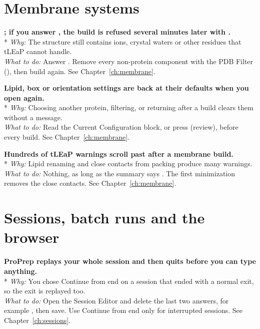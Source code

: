 \section{Membrane systems}\label{sec:troubleshooting-membrane}

{\bfseries {}; if you answer , the build is
refused several minutes later with .}\\*
\emph{Why:} The structure still contains ions, crystal waters or other
residues that tLEaP cannot handle.\\
\emph{What to do:} Answer . Remove every non-protein component with the
PDB Filter (), then build again. See Chapter~\ref{ch:membrane}.

{\bfseries Lipid, box or orientation settings are back at their defaults when
you open  again.}\\*
\emph{Why:} Choosing another protein, filtering, or returning after a build
clears them without a message.\\
\emph{What to do:} Read the \textsf{Current Configuration} block, or press
 (review), before every build. See Chapter~\ref{ch:membrane}.

{\bfseries Hundreds of tLEaP warnings scroll past after a membrane build.}\\*
\emph{Why:} Lipid renaming and close contacts from packing produce many
warnings.\\
\emph{What to do:} Nothing, as long as the summary says .
The first minimization removes the close contacts. See
Chapter~\ref{ch:membrane}.

\section{Sessions, batch runs and the browser}\label{sec:troubleshooting-sessions}

{\bfseries ProPrep replays your whole session and then quits before you can
type anything.}\\*
\emph{Why:} You chose \textsf{Continue from end} on a session that ended with
a normal exit, so the exit is replayed too.\\
\emph{What to do:} Open the Session Editor and delete the last two answers,
for example , then save. Use \textsf{Continue from end} only for
interrupted sessions. See Chapter~\ref{ch:sessions}.


